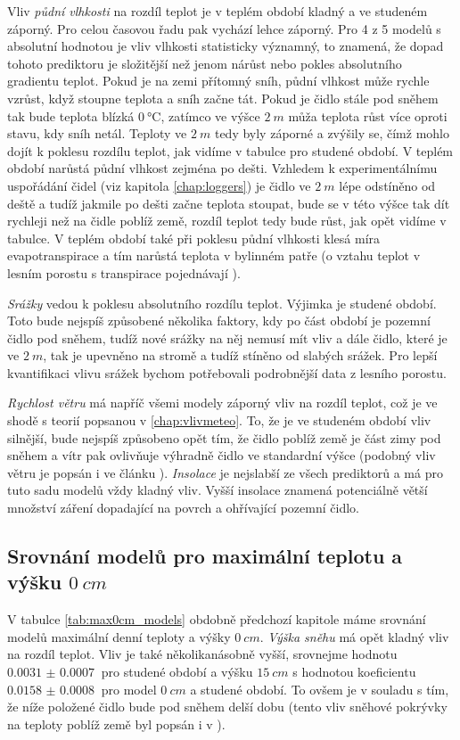 Vliv \textit{půdní vlhkosti} na rozdíl teplot je v teplém období kladný a ve studeném záporný. Pro celou časovou řadu pak vychází lehce záporný. Pro 4 z 5 modelů s absolutní hodnotou je vliv vlhkosti statisticky významný, to znamená, že dopad tohoto prediktoru je složitější než jenom nárůst nebo pokles absolutního gradientu teplot. Pokud je na zemi přítomný sníh, půdní vlhkost může rychle vzrůst, když stoupne teplota a sníh začne tát. Pokud je čidlo stále pod sněhem tak bude teplota blízká $\SI{0}{\celsius}$, zatímco ve výšce $\SI{2}{m}$ můža teplota růst více oproti stavu, kdy sníh netál. Teploty ve $\SI{2}{m}$ tedy byly záporné a zvýšily se, čímž mohlo dojít k poklesu rozdílu teplot, jak vidíme v tabulce pro studené období. V teplém období narůstá půdní vlhkost zejména po dešti. Vzhledem k experimentálnímu uspořádání čidel (viz kapitola \ref{chap:loggers}) je čidlo ve $\SI{2}{m}$ lépe odstíněno od deště a tudíž jakmile po dešti začne teplota stoupat, bude se v této výšce tak dít rychleji než na čidle poblíž země, rozdíl teplot tedy bude růst, jak opět vidíme v tabulce. V teplém období také při poklesu půdní vlhkosti klesá míra evapotranspirace a tím narůstá teplota v bylinném patře (o vztahu teplot v lesním porostu s transpirace pojednávají \cite{snow_deFrenneForestMicroclimates}).

\textit{Srážky} vedou k poklesu absolutního rozdílu teplot. Výjimka je studené období. Toto bude nejspíš způsobené několika faktory, kdy po část období je pozemní čidlo pod sněhem, tudíž nové srážky na něj nemusí mít vliv a dále čidlo, které je ve $\SI{2}{m}$, tak je upevněno na stromě a tudíž stíněno od slabých srážek. Pro lepší kvantifikaci vlivu srážek bychom potřebovali podrobnější data z lesního porostu.

\textit{Rychlost větru} má napříč všemi modely záporný vliv na rozdíl teplot, což je ve shodě s teorií popsanou v \ref{chap:vlivmeteo}. To, že je ve studeném období vliv silnější, bude nejspíš způsobeno opět tím, že čidlo poblíž země je část zimy pod sněhem a vítr pak ovlivňuje výhradně čidlo ve standardní výšce (podobný vliv větru je popsán i ve článku \cite{wind_contrastingmicroclimates}). \textit{Insolace} je nejslabší ze všech prediktorů a má pro tuto sadu modelů vždy kladný vliv. Vyšší insolace znamená potenciálně větší množství záření dopadající na povrch a ohřívající pozemní čidlo.

\subsection{Srovnání modelů pro maximální teplotu a výšku $\SI{0}{cm}$}
V tabulce \ref{tab:max0cm_models} obdobně předchozí kapitole máme srovnání modelů maximální denní teploty a výšky $\SI{0}{cm}$. \textit{Výška sněhu} má opět kladný vliv na rozdíl teplot. Vliv je také několikanásobně vyšší, srovnejme hodnotu $\SI{0.0031(7)}{}$ pro studené období a výšku $\SI{15}{cm}$ s hodnotou koeficientu $\SI{0.0158(8)}{}$ pro model $\SI{0}{cm}$ a studené období. To ovšem je v souladu s tím, že níže položené čidlo bude pod sněhem delší dobu (tento vliv sněhové pokrývky na teploty poblíž země byl popsán i v \cite{snow_deFrenneForestMicroclimates}).

